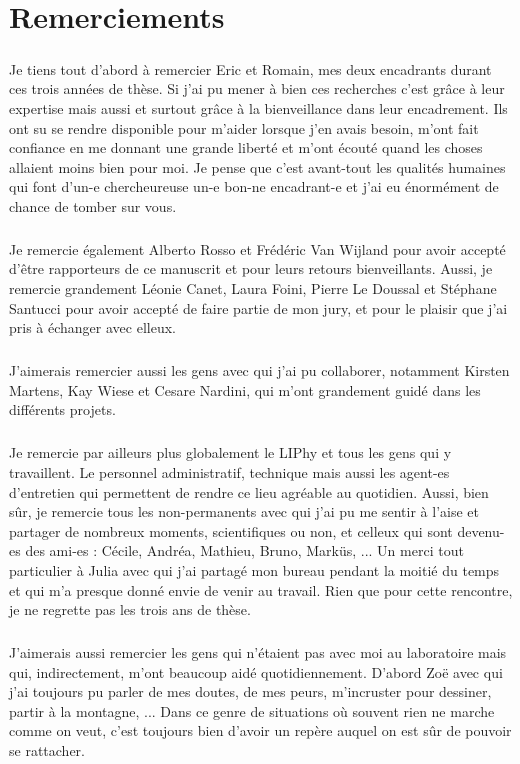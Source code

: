 \thispagestyle{empty}

\section*{Remerciements}

\subparagraph{}Je tiens tout d'abord à remercier Eric et Romain, mes deux encadrants durant ces trois années de thèse. Si j'ai pu mener à bien ces recherches c'est grâce à leur expertise mais aussi et surtout grâce à la bienveillance dans leur encadrement. Ils ont su se rendre disponible pour m'aider lorsque j'en avais besoin, m'ont fait confiance en me donnant une grande liberté et m'ont écouté quand les choses allaient moins bien pour moi. Je pense que c'est avant-tout les qualités humaines qui font d'un-e chercheureuse un-e bon-ne encadrant-e et j'ai eu énormément de chance de tomber sur vous.

\subparagraph{}Je remercie également Alberto Rosso et Frédéric Van Wijland pour avoir accepté d'être rapporteurs de ce manuscrit et pour leurs retours bienveillants. Aussi, je remercie grandement Léonie Canet, Laura Foini, Pierre Le Doussal et Stéphane Santucci pour avoir accepté de faire partie de mon jury, et pour le plaisir que j'ai pris à échanger avec elleux.

\subparagraph{}J'aimerais remercier aussi les gens avec qui j'ai pu collaborer, notamment Kirsten Martens, Kay Wiese et Cesare Nardini, qui m'ont grandement guidé dans les différents projets.

\subparagraph{}Je remercie par ailleurs plus globalement le LIPhy et tous les gens qui y travaillent. Le personnel administratif, technique mais aussi les agent-es d'entretien qui permettent de rendre ce lieu agréable au quotidien. Aussi, bien sûr, je remercie tous les non-permanents avec qui j'ai pu me sentir à l'aise et partager de nombreux moments, scientifiques ou non, et celleux qui sont devenu-es des ami-es : Cécile, Andréa, Mathieu, Bruno, Marküs, ... Un merci tout particulier à Julia avec qui j'ai partagé mon bureau pendant la moitié du temps et qui m'a presque donné envie de venir au travail. Rien que pour cette rencontre, je ne regrette pas les trois ans de thèse.

\subparagraph{}J'aimerais aussi remercier les gens qui n'étaient pas avec moi au laboratoire mais qui, indirectement, m'ont beaucoup aidé quotidiennement. D'abord Zoë avec qui j'ai toujours pu parler de mes doutes, de mes peurs, m'incruster pour dessiner, partir à la montagne, ... Dans ce genre de situations où souvent rien ne marche comme on veut, c'est toujours bien d'avoir un repère auquel on est sûr de pouvoir se rattacher.


